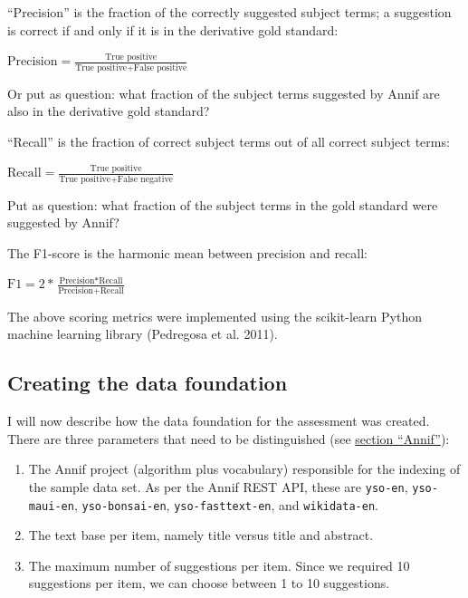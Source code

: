 ``Precision'' is the fraction of the correctly suggested subject terms;
a suggestion is correct if and only if it is in the derivative gold
standard:

\begin{center} 
$\text{Precision} = \displaystyle \frac{\text{True positive}}{\text{True positive} + \text{False positive}}$
\end{center}

Or put as question: what fraction of the subject terms suggested by
Annif are also in the derivative gold standard?

``Recall'' is the fraction of correct subject terms out of all correct
subject terms:

\begin{center} 
$\text{Recall} = \displaystyle \frac{\text{True positive}}{\text{True positive} + \text{False negative}}$
\end{center}

Put as question: what fraction of the subject terms in the gold standard
were suggested by Annif?

The F1-score is the harmonic mean between precision and recall:

\begin{center} 
$\text{F1} = \displaystyle 2 * \frac{\text{Precision} * \text{Recall}}{\text{Precision} + \text{Recall}}$
\end{center}

The above scoring metrics were implemented using the scikit-learn Python
machine learning library (Pedregosa et al. 2011).

\hypertarget{creating-the-data-foundation}{%
\subsection{Creating the data
foundation}\label{creating-the-data-foundation}}

I will now describe how the data foundation for the assessment was
created. There are three parameters that need to be distinguished (see
\protect\hyperlink{annif}{section ``Annif''}):

\begin{enumerate}
\def\labelenumi{\arabic{enumi}.}
\tightlist
\item
  The Annif project (algorithm plus vocabulary) responsible for the
  indexing of the sample data set. As per the Annif REST API, these are
  \texttt{yso-en}, \texttt{yso-maui-en}, \texttt{yso-bonsai-en},
  \texttt{yso-fasttext-en}, and \texttt{wikidata-en}.
\item
  The text base per item, namely title versus title and abstract.
\item
  The maximum number of suggestions per item. Since we required 10
  suggestions per item, we can choose between 1 to 10 suggestions.
\end{enumerate}


